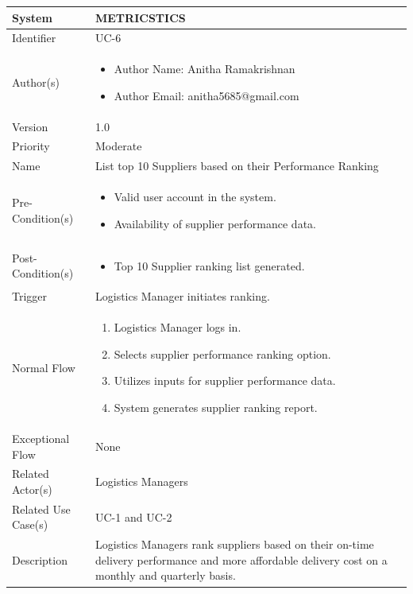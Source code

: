 \begin{center}
	\begin{tabularx}{\textwidth}{|l|X|}
		\hline
		System & METRICSTICS \\
		\hline
		Identifier & UC-6 \\
		\hline
		Author(s) & \begin{itemize}[left=0pt]
			\item Author Name: Anitha Ramakrishnan
			\item Author Email: anitha5685@gmail.com
		\end{itemize} \\
		\hline
		Version & 1.0 \\
		\hline
		Priority & Moderate \\
		\hline
		Name & List top 10 Suppliers based on their Performance Ranking \\
		\hline
		Pre-Condition(s) &  \begin{itemize}[left=0pt]
			\item Valid user account in the system.
			\item Availability of supplier performance data.
		\end{itemize} \\
		\hline
		Post-Condition(s) & \begin{itemize}[left=0pt]
			\item Top 10 Supplier ranking list generated.
		\end{itemize} \\
		\hline
		Trigger & Logistics Manager initiates ranking. \\
		\hline
		Normal Flow & \begin{enumerate}[left=0pt]
			\item Logistics Manager logs in.
			\item Selects supplier performance ranking option.
			\item Utilizes inputs for supplier performance data.
			\item System generates supplier ranking report.
		\end{enumerate} \\
		\hline
		Exceptional Flow & None \\
		\hline
		Related Actor(s) & Logistics Managers \\
		\hline
		Related Use Case(s) & UC-1 and UC-2 \\
		\hline
		Description & Logistics Managers rank suppliers based on their on-time delivery performance and more affordable delivery cost on a monthly and quarterly basis. \\
		\hline
	\end{tabularx}
\end{center}

